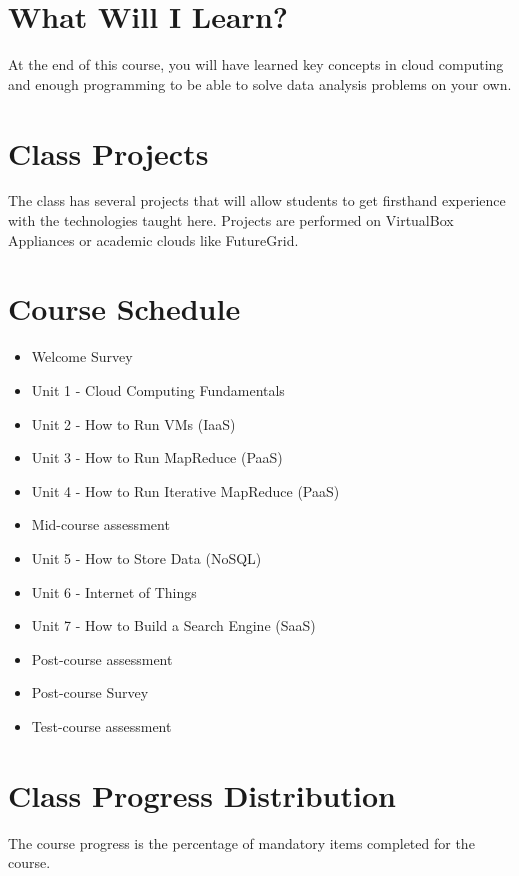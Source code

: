 \section{What Will I Learn?}

At the end of this course, you will have learned key concepts in cloud
computing and enough programming to be able to solve data analysis problems on
your own.

\section{Class Projects}

The class has several projects that will allow students to get firsthand
experience with the technologies taught here. Projects are performed on
VirtualBox Appliances or academic clouds like FutureGrid.

\section{Course Schedule}



\begin{itemize}
  \item Welcome Survey
  \item Unit 1 - Cloud Computing Fundamentals
  \item Unit 2 - How to Run VMs (IaaS)
  \item Unit 3 - How to Run MapReduce (PaaS)
  \item Unit 4 - How to Run Iterative MapReduce (PaaS)
  \item Mid-course assessment
  \item Unit 5 - How to Store Data (NoSQL)
  \item Unit 6 - Internet of Things
  \item Unit 7 - How to Build a Search Engine (SaaS)
  \item Post-course assessment
  \item Post-course Survey
  \item Test-course assessment
\end{itemize}

\section{Class Progress Distribution}

The course progress is the percentage of mandatory items completed for the course.

